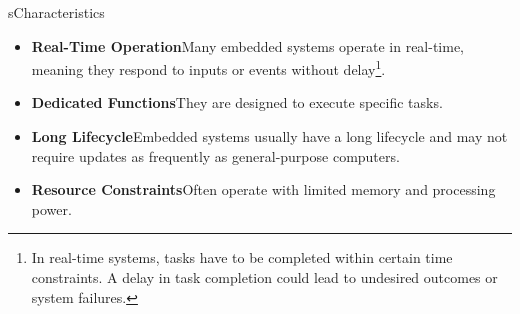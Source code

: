\begin{frame}{s}{Characteristics}
    \begin{itemize}
        \item \textbf{Real-Time Operation}\newline Many embedded systems operate in real-time, meaning they respond to inputs or events without delay\footnote{In real-time systems, tasks have to be completed within certain time constraints. A delay in task completion could lead to undesired outcomes or system failures.}.
        \item \textbf{Dedicated Functions}\newline They are designed to execute specific tasks.
        \item \textbf{Long Lifecycle}\newline Embedded systems usually have a long lifecycle and may not require updates as frequently as general-purpose computers.
        \item \textbf{Resource Constraints}\newline Often operate with limited memory and processing power.
    \end{itemize}
\end{frame}